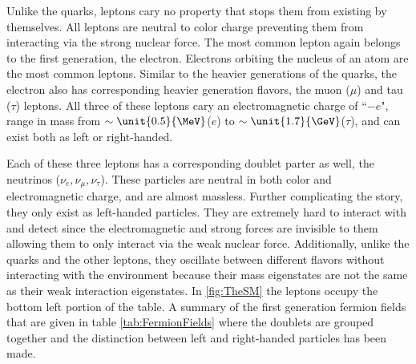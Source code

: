 Unlike the quarks, leptons cary no property that stops them from existing by themselves. All leptons are neutral to color charge preventing them from interacting via the strong nuclear force. The most common lepton again belongs to the first generation, the electron. Electrons orbiting the nucleus of an atom are the most common leptons. Similar to the heavier generations of the quarks, the electron also has corresponding heavier generation flavors, the muon ($\mu$) and tau ($\tau$) leptons. All three of these leptons cary an electromagnetic charge of ``$-e$", range in mass from $\sim\unit{0.5}{\MeV}$($e$) to $\sim\unit{1.7}{\GeV}$($\tau$), and can exist both as left or right-handed.

Each of these three leptons has a corresponding doublet parter as well, the neutrinos ($\nu_{e}, \nu_{\mu}, \nu_{\tau}$). These particles are neutral in both color and electromagnetic charge, and are almost massless. Further complicating the story, they only exist as left-handed particles. They are extremely hard to interact with and detect since the electromagnetic and strong forces are invisible to them allowing them to only interact via the weak nuclear force. Additionally, unlike the quarks and the other leptons, they oscillate between different flavors without interacting with the environment because their mass eigenstates are not the same as their weak interaction eigenstates. In \ref{fig:TheSM} the leptons occupy the bottom left portion of the table. A summary of the first generation fermion fields that are given in table \ref{tab:FermionFields} where the doublets are grouped together and the distinction between left and right-handed particles has been made.


